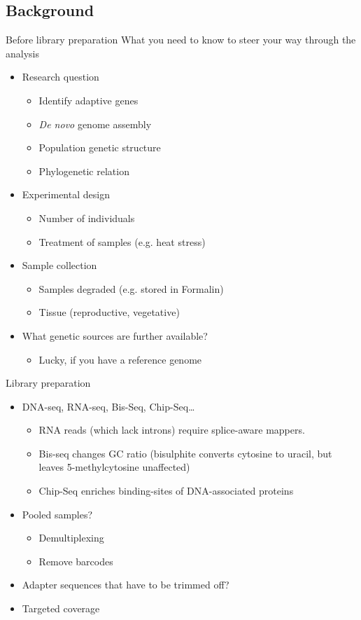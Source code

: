 \documentclass[presentation]{beamer}
\begin{document}
\subsection{Background}
\label{sec-1-1}
\begin{frame}[label=sec-1-1-1]{Before library preparation}
What you need to know to steer your way through the analysis
\begin{itemize}
\item Research question
\begin{itemize}
\item Identify adaptive genes
\item \emph{De novo} genome assembly
\item Population genetic structure
\item Phylogenetic relation
\end{itemize}
\item Experimental design
\begin{itemize}
\item Number of individuals
\item Treatment of samples (e.g. heat stress)
\end{itemize}
\item Sample collection
\begin{itemize}
\item Samples degraded (e.g. stored in Formalin)
\item Tissue (reproductive, vegetative)
\end{itemize}
\item What genetic sources are further available? 
\begin{itemize}
\item Lucky, if you have a reference genome
\end{itemize}
\end{itemize}
\end{frame}
\begin{frame}[label=sec-1-1-2]{Library preparation}
\begin{itemize}
\item DNA-seq, RNA-seq, Bis-Seq, Chip-Seq\ldots{}
\begin{itemize}
\item RNA reads (which lack introns) require splice-aware mappers.
\item Bis-seq changes GC ratio (bisulphite converts cytosine to uracil, but leaves 5-methylcytosine unaffected)
\item Chip-Seq enriches binding-sites of DNA-associated proteins
\end{itemize}
\item Pooled samples?
\begin{itemize}
\item Demultiplexing
\item Remove barcodes
\end{itemize}
\item Adapter sequences that have to be trimmed off?
\item Targeted coverage
\end{itemize}
\end{frame}
\end{document}
